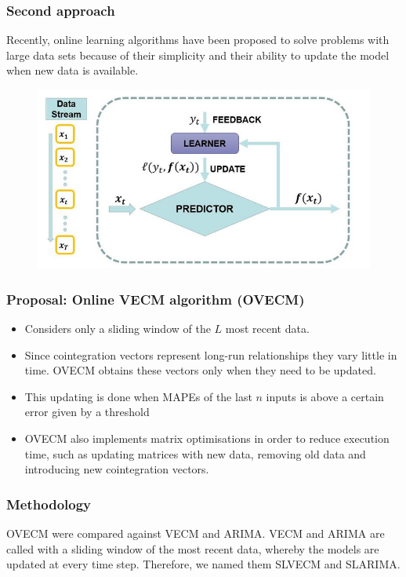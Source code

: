 \documentclass{beamer}
\begin{document}
\begin{frame}
\frametitle{Second approach}
 Recently, online learning algorithms have been proposed to solve problems with large data sets because of their simplicity and their ability to update the model when new data is
available.
\begin{figure}
\includegraphics[width=0.6\paperwidth]{img/onlinelearning}
\end{figure} 
\end{frame}


\begin{frame}
\frametitle{Proposal: Online VECM algorithm (OVECM)}
\begin{itemize}
\item Considers only a sliding window of the $L$ most recent data. 
\item Since cointegration vectors represent long-run relationships they vary
little in time. OVECM obtains these vectors only when they need to be updated. 
\item This updating is done when MAPEs of the last $n$ inputs is above a certain
error given by a threshold 
\item OVECM also implements matrix optimisations in order to reduce execution time,
such as updating matrices with new data, removing old data and introducing new
cointegration vectors.
\end{itemize}
\end{frame}

\begin{frame}
\frametitle{Methodology}
OVECM were compared against VECM and ARIMA. VECM and ARIMA are called with a
sliding window of the most recent data, whereby the models are updated at every
time step. Therefore, we named them SLVECM and SLARIMA.
\end{frame}
\end{document}
